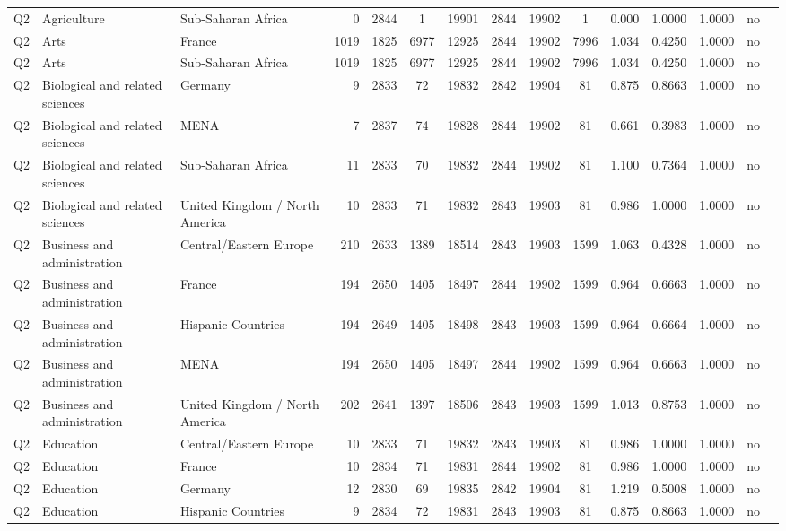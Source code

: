 \begin{longtable}{lllrcccccccccll}
Q2 & Agriculture & Sub-Saharan Africa & 0 & 2844 & 1 & 19901 & 2844 & 19902 & 1 & 0.000 & 1.0000 & 1.0000 & no \\
Q2 & Arts & France & 1019 & 1825 & 6977 & 12925 & 2844 & 19902 & 7996 & 1.034 & 0.4250 & 1.0000 & no \\
Q2 & Arts & Sub-Saharan Africa & 1019 & 1825 & 6977 & 12925 & 2844 & 19902 & 7996 & 1.034 & 0.4250 & 1.0000 & no \\
Q2 & Biological and related sciences & Germany & 9 & 2833 & 72 & 19832 & 2842 & 19904 & 81 & 0.875 & 0.8663 & 1.0000 & no \\
Q2 & Biological and related sciences & MENA & 7 & 2837 & 74 & 19828 & 2844 & 19902 & 81 & 0.661 & 0.3983 & 1.0000 & no \\
Q2 & Biological and related sciences & Sub-Saharan Africa & 11 & 2833 & 70 & 19832 & 2844 & 19902 & 81 & 1.100 & 0.7364 & 1.0000 & no \\
Q2 & Biological and related sciences & United Kingdom / North America & 10 & 2833 & 71 & 19832 & 2843 & 19903 & 81 & 0.986 & 1.0000 & 1.0000 & no \\
Q2 & Business and administration & Central/Eastern Europe & 210 & 2633 & 1389 & 18514 & 2843 & 19903 & 1599 & 1.063 & 0.4328 & 1.0000 & no \\
Q2 & Business and administration & France & 194 & 2650 & 1405 & 18497 & 2844 & 19902 & 1599 & 0.964 & 0.6663 & 1.0000 & no \\
Q2 & Business and administration & Hispanic Countries & 194 & 2649 & 1405 & 18498 & 2843 & 19903 & 1599 & 0.964 & 0.6664 & 1.0000 & no \\
Q2 & Business and administration & MENA & 194 & 2650 & 1405 & 18497 & 2844 & 19902 & 1599 & 0.964 & 0.6663 & 1.0000 & no \\
Q2 & Business and administration & United Kingdom / North America & 202 & 2641 & 1397 & 18506 & 2843 & 19903 & 1599 & 1.013 & 0.8753 & 1.0000 & no \\
Q2 & Education & Central/Eastern Europe & 10 & 2833 & 71 & 19832 & 2843 & 19903 & 81 & 0.986 & 1.0000 & 1.0000 & no \\
Q2 & Education & France & 10 & 2834 & 71 & 19831 & 2844 & 19902 & 81 & 0.986 & 1.0000 & 1.0000 & no \\
Q2 & Education & Germany & 12 & 2830 & 69 & 19835 & 2842 & 19904 & 81 & 1.219 & 0.5008 & 1.0000 & no \\
Q2 & Education & Hispanic Countries & 9 & 2834 & 72 & 19831 & 2843 & 19903 & 81 & 0.875 & 0.8663 & 1.0000 & no \\

\end{longtable}
